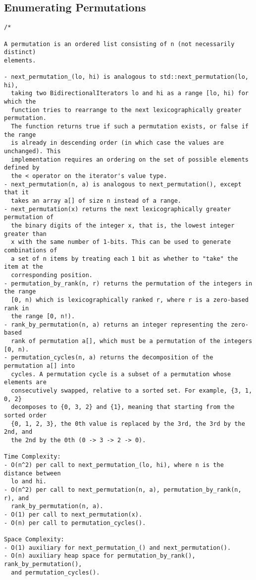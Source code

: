 \subsection{Enumerating Permutations}
\begin{lstlisting}
/*

A permutation is an ordered list consisting of n (not necessarily distinct)
elements.

- next_permutation_(lo, hi) is analogous to std::next_permutation(lo, hi),
  taking two BidirectionalIterators lo and hi as a range [lo, hi) for which the
  function tries to rearrange to the next lexicographically greater permutation.
  The function returns true if such a permutation exists, or false if the range
  is already in descending order (in which case the values are unchanged). This
  implementation requires an ordering on the set of possible elements defined by
  the < operator on the iterator's value type.
- next_permutation(n, a) is analogous to next_permutation(), except that it
  takes an array a[] of size n instead of a range.
- next_permutation(x) returns the next lexicographically greater permutation of
  the binary digits of the integer x, that is, the lowest integer greater than
  x with the same number of 1-bits. This can be used to generate combinations of
  a set of n items by treating each 1 bit as whether to "take" the item at the
  corresponding position.
- permutation_by_rank(n, r) returns the permutation of the integers in the range
  [0, n) which is lexicographically ranked r, where r is a zero-based rank in
  the range [0, n!).
- rank_by_permutation(n, a) returns an integer representing the zero-based
  rank of permutation a[], which must be a permutation of the integers [0, n).
- permutation_cycles(n, a) returns the decomposition of the permutation a[] into
  cycles. A permutation cycle is a subset of a permutation whose elements are
  consecutively swapped, relative to a sorted set. For example, {3, 1, 0, 2}
  decomposes to {0, 3, 2} and {1}, meaning that starting from the sorted order
  {0, 1, 2, 3}, the 0th value is replaced by the 3rd, the 3rd by the 2nd, and
  the 2nd by the 0th (0 -> 3 -> 2 -> 0).

Time Complexity:
- O(n^2) per call to next_permutation_(lo, hi), where n is the distance between
  lo and hi.
- O(n^2) per call to next_permutation(n, a), permutation_by_rank(n, r), and
  rank_by_permutation(n, a).
- O(1) per call to next_permutation(x).
- O(n) per call to permutation_cycles().

Space Complexity:
- O(1) auxiliary for next_permutation_() and next_permutation().
- O(n) auxiliary heap space for permutation_by_rank(), rank_by_permutation(),
  and permutation_cycles().


\end{lstlisting}
